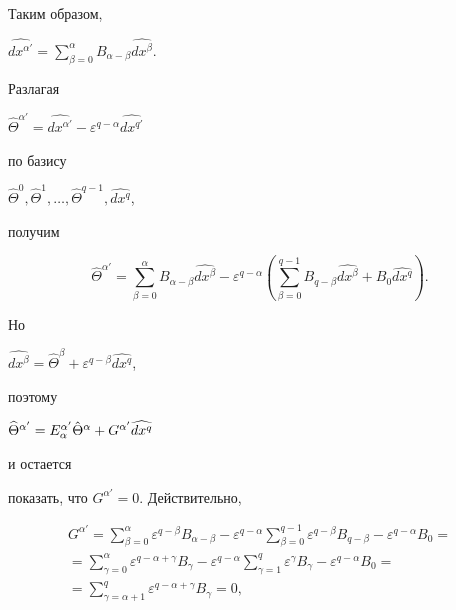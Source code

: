 Таким образом,


$\widehat{dx^{\alpha'}} =


\sum\limits_{\beta=0}^\alpha B_{\alpha - \beta}\widehat{dx^\beta}$.


Разлагая


$\widehat\Theta^{\alpha'} =


\widehat{dx^{\alpha'}} -


\varepsilon^{q-\alpha}\widehat{dx^{q'}}$


по базису


$\widehat\Theta^0, \widehat\Theta^1, \dotsc, \widehat\Theta^{q-1},


\widehat{dx^q}$,


получим


$$


\widehat\Theta^{\alpha'} =


\sum^\alpha_{\beta=0}B_{\alpha-\beta}\widehat{dx^\beta} -


\varepsilon^{q-\alpha}


(\sum_{\beta=0}^{q-1}B_{q-\beta}\widehat{dx^\beta} +


B_0 \widehat{dx^q}).


$$


Но


$\widehat{dx^\beta} =


\widehat\Theta^\beta + \varepsilon^{q-\beta}\widehat{dx^q}$,


поэтому


$\widehat\Theta^{\alpha'} =


E_\alpha^{\alpha'}\Hat\Theta^\alpha


+ G^{\alpha'}\widehat{dx^q}$


и остается


показать, что $G^{\alpha'} = 0$. Действительно,


\begin{gather*}


G^{\alpha'}  =


\sum_{\beta=0}^\alpha \varepsilon^{q-\beta}B_{\alpha-\beta}


- \varepsilon^{q-\alpha}\sum_{\beta=0}^{q-1}


\varepsilon^{q-\beta}B_{q-\beta} - \varepsilon^{q-\alpha}B_0 =\\


%


= \sum_{\gamma=0}^\alpha \varepsilon^{q-\alpha+\gamma}B_\gamma -


\varepsilon^{q-\alpha}\sum_{\gamma=1}^q


\varepsilon^\gamma B_\gamma -


\varepsilon^{q-\alpha}B_0 = \\


%


= \sum_{\gamma=\alpha + 1}^q


\varepsilon^{q-\alpha+\gamma}B_\gamma = 0,


\end{gather*}


